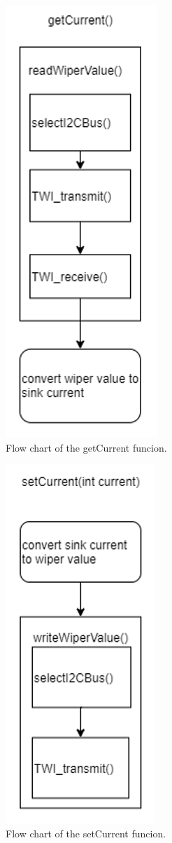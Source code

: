 \begin{figure}[h]
    \centering
    \includegraphics[scale=0.5]{software_getCurrent_flow_chart.png}
    \caption{Flow chart of the getCurrent funcion.}
\end{figure}

\begin{figure}[h]
    \centering
    \includegraphics[scale=0.5]{software_setCurrent_flow_chart.png}
    \caption{Flow chart of the setCurrent funcion.}
\end{figure}


